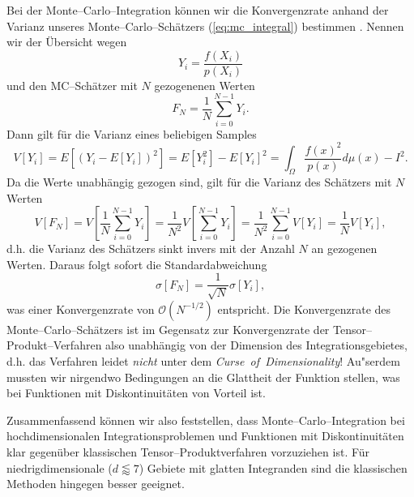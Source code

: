 	Bei der Monte--Carlo--Integration können wir die Konvergenzrate anhand der Varianz unseres Monte--Carlo--Schätzers (\ref{eq:mc_integral}) bestimmen \citep[][2.4.1]{Veach:1997p9136}. Nennen wir der Übersicht wegen
	$$Y_i=\frac{f(X_i)}{p(X_i)}$$
	und den MC--Schätzer mit $N$ gezogenenen Werten
	$$F_N=\frac{1}{N}\sum_{i=0}^{N-1} Y_i.$$
	Dann gilt für die Varianz eines beliebigen Samples
	\begin{equation}
		V[Y_i]=E[(Y_i-E[Y_i])^2]=E[Y_i^2]-E[Y_i]^2=\int_\Omega \frac{f(x)^2}{p(x)}d\mu(x)-I^2.
		\label{eq:mc_variance}
	\end{equation}
	Da die Werte unabhängig gezogen sind, gilt für die Varianz des Schätzers mit $N$ Werten
	$$V[F_N]=V\left[\frac{1}{N}\sum_{i=0}^{N-1}Y_i\right]=\frac{1}{N^2}V\left[\sum_{i=0}^{N-1}Y_i\right]=\frac{1}{N^2}\sum_{i=0}^{N-1}V[Y_i]=\frac{1}{N}V[Y_i],$$
	d.h. die Varianz des Schätzers sinkt invers mit der Anzahl $N$ an gezogenen Werten. Daraus folgt sofort die Standardabweichung
	\begin{equation}
		\sigma[F_N]=\frac{1}{\sqrt{N}}\sigma[Y_i],
		\label{eq:mc_standarddeviation}
	\end{equation}
	was einer Konvergenzrate von $\mathcal{O}(N^{-1/2})$ entspricht. Die Konvergenzrate des Monte--Carlo--Schätzers ist im Gegensatz zur Konvergenzrate der Tensor--Produkt--Verfahren also unabhängig von der Dimension des Integrationsgebietes, d.h. das Verfahren leidet {\em nicht} unter dem {\em Curse~of~Dimensionality}! Au"serdem mussten wir nirgendwo Bedingungen an die Glattheit der Funktion stellen, was bei Funktionen mit Diskontinuitäten von Vorteil ist.
	
	Zusammenfassend können wir also feststellen, dass Monte--Carlo--Integration bei hochdimensionalen Integrationsproblemen und Funktionen mit Diskontinuitäten klar gegenüber klassischen Tensor--Produktverfahren vorzuziehen ist. Für niedrigdimensionale ($d\lessapprox 7$) Gebiete mit glatten Integranden sind die klassischen Methoden hingegen besser geeignet.
	
	
